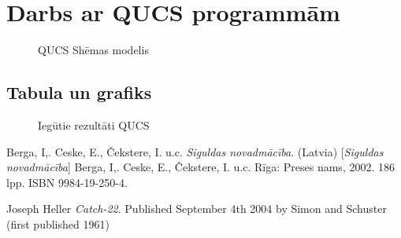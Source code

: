 \documentclass{report}
\begin{document}
\section{Darbs ar QUCS programmām}
\begin{figure}[h]
        \centering
        \caption{QUCS Shēmas modelis}
        \label{fig:my_label4}
    \end{figure}
    
    
    
    
    

    
    
    
    
    
    
    
    
    
    
    \subsection{Tabula un grafiks}
    \begin{figure}[h]
        \centering
        \caption{Iegūtie rezultāti QUCS}
        \label{fig:my_label5}
\end{figure}
\begin{thebibliography}{9}
Berga, I,. Ceske, E., Čekstere, I. u.c. 
\textit{Siguldas novadmācība}. (Latvia) 
[\textit{Siguldas novadmācība}]
Berga, I,. Ceske, E., Čekstere, I. u.c. Rīga: Preses nams, 2002. 186 lpp. ISBN 9984-19-250-4.

Joseph Heller
\textit{Catch-22}. 
Published September 4th 2004 by Simon and Schuster (first published 1961)
\end{thebibliography}
\end{document}
